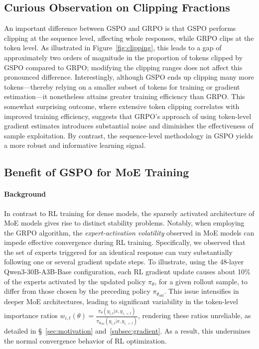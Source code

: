 \subsection{Curious Observation on Clipping Fractions}

An important difference between GSPO and GRPO is that GSPO performs clipping at the sequence level, affecting whole responses, while GRPO clips at the token level. As illustrated in Figure~\ref{fig:clipping}, this leads to a gap of approximately two orders of magnitude in the proportion of tokens clipped by GSPO compared to GRPO; modifying the clipping ranges does not affect this pronounced difference. Interestingly, although GSPO ends up clipping many more tokens—thereby relying on a smaller subset of tokens for training or gradient estimation—it nonetheless attains greater training efficiency than GRPO. This somewhat surprising outcome, where extensive token clipping correlates with improved training efficiency, suggests that GRPO's approach of using token-level gradient estimates introduces substantial noise and diminishes the effectiveness of sample exploitation. By contrast, the sequence-level methodology in GSPO yields a more robust and informative learning signal.

\subsection{Benefit of GSPO for MoE Training}
\label{subsec:routing_replay}

\paragraph{Background}
In contrast to RL training for dense models, the sparsely activated architecture of MoE models gives rise to distinct stability problems. Notably, when employing the GRPO algorithm, the \textit{expert-activation volatility} observed in MoE models can impede effective convergence during RL training. Specifically, we observed that the set of experts triggered for an identical response can vary substantially following one or several gradient update steps. To illustrate, using the 48-layer Qwen3-30B-A3B-Base configuration, each RL gradient update causes about 10\% of the experts activated by the updated policy $\pi_{\theta}$, for a given rollout sample, to differ from those chosen by the preceding policy $\pi_{\theta_\text{old}}$.
This issue intensifies in deeper MoE architectures, leading to significant variability in the token-level importance ratios $w_{i,t}(\theta) = \frac{ \pi_{\theta} (y_{i,t} | x, y_{i,<t}) }{ \pi_{\theta_\text{old}} (y_{i,t} | x,y_{i,<t})}$, rendering these ratios unreliable, as detailed in \S~\ref{sec:motivation} and~\ref{subsec:gradient}. As a result, this undermines the normal convergence behavior of RL optimization.

